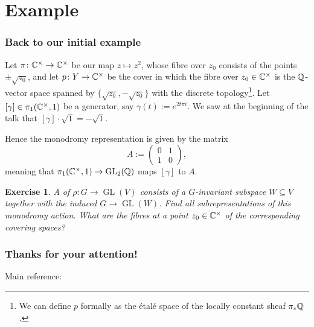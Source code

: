 \documentclass[notheorems, hyperref={backref}]{beamer}
\newtheorem{exe}{Exercise}
\begin{document}
\section{Example}
\begin{frame}
    \frametitle{Back to our initial example}
    Let $\pi\colon \mathbb{C}^{\times}\to \mathbb{C}^{\times}$ be our map $z\mapsto z^{2}$, whose fibre over $z_{0}$ consists of the points $\pm\sqrt{z_{0}}$, and let $p\colon Y\to \mathbb{C}^{\times}$ be the cover in which the fibre over $z_{0}\in \mathbb{C}^{\times}$ is the $\mathbb{Q}$-vector space spanned by $\{ \sqrt{z_{0}},-\sqrt{z_{0}}\}$ with the discrete topology\footnote{We can define $p$ formally as the étalé space of the locally constant sheaf $\pi_{*}\mathbb{Q}$.}.
    \pause
    Let $[\gamma]\in \pi_{1}(\mathbb{C}^{\times},1)$ be a generator, say $\gamma(t):=e^{2t\pi i}$.
    We saw at the beginning of the talk that $[\gamma]\cdot \sqrt{1}=-\sqrt{1}$.
    \pause

    Hence the monodromy representation is given by the matrix
    \[ A:=\begin{pmatrix}
	0 & 1 \\
	1 & 0
    \end{pmatrix},
    \]
    meaning that $\pi_{1}(\mathbb{C}^{\times},1)\to \operatorname{GL_{2}(\mathbb{Q})}$ maps $[\gamma]$ to $A$.
    \pause
    \begin{exe}
	A  of $\rho\colon G\to \operatorname{GL}(V)$ consists of a $G$-invariant subspace $W\subseteq V$ together with the induced $G\to \operatorname{GL}(W)$.
	Find all subrepresentations of this monodromy action.
	What are the fibres at a point $z_{0}\in \mathbb{C}^{\times}$ of the corresponding covering spaces?
    \end{exe}
\end{frame}

\begin{frame}
    \frametitle{Thanks for your attention!}
    Main reference:
    
    
\end{frame}
\end{document}
